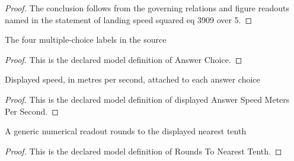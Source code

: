 \begin{proof}
  The conclusion follows from the governing relations and figure readouts named in the statement of landing speed squared eq 3909 over 5.
\end{proof}
\begin{definition}
  \label{def:physics:phyx-mini-0788:phyxminiproblems-problemphyxmini0788-answerchoice}
  The four multiple-choice labels in the source
\end{definition}
\begin{proof}
  This is the declared model definition of Answer Choice.
\end{proof}
\begin{definition}
  \label{def:physics:phyx-mini-0788:phyxminiproblems-problemphyxmini0788-displayedanswerspeedmeterspersecond}
  Displayed speed, in metres per second, attached to each answer choice
\end{definition}
\begin{proof}
  This is the declared model definition of displayed Answer Speed Meters Per Second.
\end{proof}
\begin{definition}
  \label{def:physics:phyx-mini-0788:phyxminiproblems-problemphyxmini0788-roundstonearesttenth}
  A generic numerical readout rounds to the displayed nearest tenth
\end{definition}
\begin{proof}
  This is the declared model definition of Rounds To Nearest Tenth.
\end{proof}
